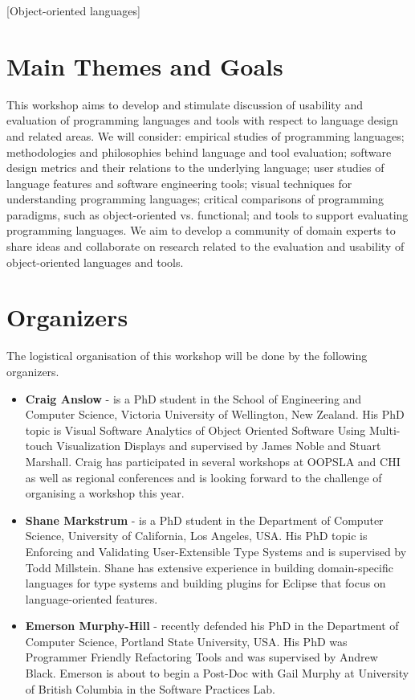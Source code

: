 \documentclass{acm_proc_article-sp}
\begin{document}
[Object-oriented languages]



\section{Main Themes and Goals}

This workshop aims to develop and stimulate discussion of usability
and evaluation of programming languages and tools with respect to
language design and related areas.  We will consider: empirical
studies of programming languages; methodologies and philosophies
behind language and tool evaluation; software design metrics and their
relations to the underlying language; user studies of language
features and software engineering tools; visual techniques for
understanding programming languages; critical comparisons of
programming paradigms, such as object-oriented vs. functional; and
tools to support evaluating programming languages.  We aim to develop
a community of domain experts to share ideas and collaborate on
research related to the evaluation and usability of object-oriented
languages and tools.

\section{Organizers}

The logistical organisation of this workshop will be done by the following organizers.

\begin{itemize}
\item \textbf{Craig Anslow} - is a PhD student in the School of
Engineering and Computer Science, Victoria University of Wellington,
New Zealand. His PhD topic is Visual Software Analytics of Object
Oriented Software Using Multi-touch Visualization Displays and
supervised by James Noble and Stuart Marshall. Craig has participated
in several workshops at OOPSLA and CHI as well as regional conferences
and is looking forward to the challenge of organising a workshop this
year.

\item \textbf{Shane Markstrum} - is a PhD student in the Department of
Computer Science, University of California, Los Angeles, USA. His PhD
topic is Enforcing and Validating User-Extensible Type Systems and is
supervised by Todd Millstein. Shane has extensive experience in
building domain-specific languages for type systems and building
plugins for Eclipse that focus on language-oriented features.

\item \textbf{Emerson Murphy-Hill} - recently defended his PhD in the
Department of Computer Science, Portland State University, USA. His
PhD was Programmer Friendly Refactoring Tools and was supervised by
Andrew Black. Emerson is about to begin a Post-Doc with Gail Murphy at
University of British Columbia in the Software Practices Lab.
\end{itemize}
\end{document}
